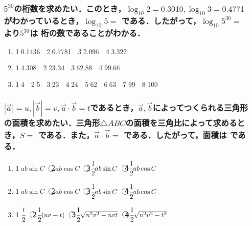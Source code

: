 \documentclass[onecolumn,10pt]{jarticle}
\newcommand{\ctext}[1]{\textcircled{\scriptsize #1}}
\begin{document}
\subsubsection{$5^{30}$の桁数を求めたい．このとき，$\log_{10}2=0.3010,\log_{10}3=0.4771$がわかっているとき，$\log_{10}5=$  である．したがって，$\log_{10}5^{30}=$  より$5^{30}$は  桁の数であることがわかる．}
\begin{enumerate}[(1)]
    \item \ctext{1}0.1436　\ctext{2}0.7781　\ctext{3}2.096　\ctext{4}3.322
    \item \ctext{1}4.308　\ctext{2}23.34　\ctext{3}62.88　\ctext{4}99.66
    \item \ctext{1}4　\ctext{2}5　\ctext{3}23　\ctext{4}24　\ctext{5}62　\ctext{6}63　\ctext{7}99　\ctext{8}100
\end{enumerate}

\subsubsection{$|\vec{a}|=u,|\vec{b}|=v,\vec{a}\cdot\vec{b}=t$であるとき，$\vec{a},\vec{b}$によってつくられる三角形の面積を求めたい．三角形$\triangle{ABC}$の面積を三角比によって求めるとき，$S=$  である．また，$\vec{a}\cdot\vec{b}=$  である．したがって，面積は  である．}
\begin{enumerate}[(1)]
    \item \ctext{1}$ab\sin{C}$　\ctext{2}$ab\cos{C}$　\ctext{3}$\cfrac{1}{2}ab\sin{C}$　\ctext{4}$\cfrac{1}{2}ab\cos{C}$
    \item \ctext{1}$ab\sin{C}$　\ctext{2}$ab\cos{C}$　\ctext{3}$\cfrac{1}{2}ab\sin{C}$　\ctext{4}$\cfrac{1}{2}ab\cos{C}$
    \item \ctext{1}$\cfrac{t}{2}$　\ctext{2}$\cfrac{1}{2}(uv-t)$　\ctext{3}$\cfrac{1}{2}\sqrt{u^2v^2-uvt}$　\ctext{4}$\cfrac{1}{2}\sqrt{u^2v^2-t^2}$
\end{enumerate}
\end{document}

